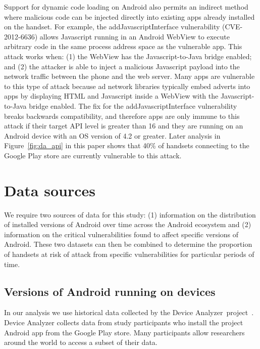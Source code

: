 \documentclass[conference,a4paper,twoside]{IEEEtran}
\newcommand{\da}{Device Analyzer}
\begin{document}
Support for dynamic code loading on Android also permits an indirect method where malicious code can be injected directly into existing apps already installed on the handset. 
For example, the addJavascriptInterface vulnerability (CVE-2012-6636) allows Javascript running in an Android WebView to execute arbitrary code in the same process address space as the vulnerable app.
This attack works when: (1) the WebView has the Javascript-to-Java bridge enabled; and (2) the attacker is able to inject a malicious Javascript payload into the network traffic between the phone and the web server. 
Many apps are vulnerable to this type of attack because ad network libraries typically embed adverts into apps by displaying HTML and Javascript inside a WebView with the Javascript-to-Java bridge enabled. 
The fix for the addJavascriptInterface vulnerability breaks backwards compatibility, and therefore apps are only immune to this attack if their target API level is greater than 16 and they are running on an Android device with an OS version of 4.2 or greater.
Later analysis in Figure~\ref{fig:da_api} in this paper shows that 40\% of handsets connecting to the Google Play store are currently vulnerable to this attack.

\section{Data sources}
\label{sec:background}

We require two sources of data for this study: (1) information on the distribution of installed versions of Android over time across the Android ecosystem and (2) information on the critical vulnerabilities found to affect specific versions of Android.
These two datasets can then be combined to determine the proportion of handsets at risk of attack from specific vulnerabilities for particular periods of time.

\subsection{Versions of Android running on devices}

In our analysis we use historical data collected by the \da\ project~\cite{Wagner2013}.
Device Analyzer collects data from study participants who install the project Android app from the Google Play store.
Many participants allow researchers around the world to access a subset of their data.
\end{document}
